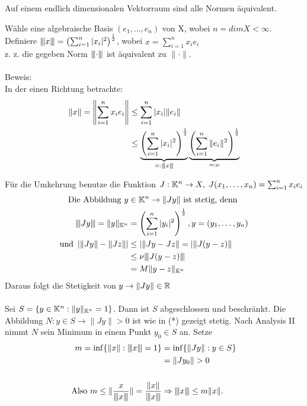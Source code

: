 \begin{satz} 
	Auf einem endlich dimensionalen Vektorraum sind alle Normen äquivalent.
\end{satz}
\begin{beweis}
	Wähle eine algebraische Basis $(e_{1}, \dotsc, e_{n})$ von X, wobei $ n = dim X < \infty$. \\
	Definiere $ {\left\vert\kern-0.25ex\left\vert\kern-0.25ex\left\vert x\right\vert\kern-0.25ex\right\vert\kern-0.25ex\right\vert} = \left(\sum_{i = 1}^{n} |x_{i}|^2\right)^{\frac{1}{2}}$, wobei $x = \sum_{i = 1}^{n} x_{i} e_{i}$ \\
	
	z. z. die gegeben Norm ${\left\vert\kern-0.25ex\left\vert\kern-0.25ex\left\vert \cdot \right\vert\kern-0.25ex\right\vert\kern-0.25ex\right\vert}$ ist äquivalent zu $\| \cdot \|$. \\ \\
	Beweis: \\
	In der einen Richtung betrachte: 
	\begin{align*}
		\| x \| = \left\| \sum_{i = 1}^{n} x_{i} e_{i} \right\| & \leq \sum_{i = 1}^{n} |x_{i}| \|  e_{i} \| \\ 
													& \leq \underbrace{ \left( \sum_{i = 1}^{n} |x_{i}|^{2} \right)^\frac{1}{2} }_{=: {\left\vert\kern-0.25ex\left\vert\kern-0.25ex\left\vert x \right\vert\kern-0.25ex\right\vert\kern-0.25ex\right\vert}} \underbrace{ \left( \sum_{i = 1}^{n} \| e_{i} \|^{2} \right)^\frac{1}{2} }_{=: \nu}
	\end{align*}
	
	Für die Umkehrung benutze die Funktion $J: \mathbb{K}^{n} \rightarrow X, \hspace{0.1cm} J(x_{1}, \dotsc, x_{n}) = \sum_{i = 1}^{n} x_{i} e_{i} $ \\
	\begin{align*}
 	 \text{Die Abbildung } y & \in \mathbb{K}^{n}  \rightarrow \| Jy \| \text{ ist stetig, denn} \\
 	 	 {\left\vert\kern-0.25ex\left\vert\kern-0.25ex\left\vert Jy \right\vert\kern-0.25ex\right\vert\kern-0.25ex\right\vert} = \| y \|_{\mathbb{K}^{n}} & = \left( \sum_{i = 1}^{n} |y_{i}|^{2} \right)^{\frac{1}{2}}, y = (y_{1}, \dotsc, y_{n}) \\
 	 	 \text{und } \left| \| Jy \| - \| Jz \| \right| & \leq | \| Jy - Jz \| = | \| J(y - z) \| \\
 	 	 & \leq \nu {\left\vert\kern-0.25ex\left\vert\kern-0.25ex\left\vert J (y - z) \right\vert\kern-0.25ex\right\vert\kern-0.25ex\right\vert} \\
 	 	 & = M \| y - z \|_{\mathbb{K}^{n}} \\
 	 \end{align*}
 Daraus folgt die Stetigkeit von $ y \rightarrow \| Jy \| \in \mathbb{R} $ \\ \\
	Sei $S = \{y \in \mathbb{K}^{n}: \| y \|_{\mathbb{K}^n} = 1 \}$. Dann ist $S$ abgeschlossen und beschränkt.
	Die Abbildung $N : y \in S \rightarrow \| Jy \| > 0$ ist wie in (*) gezeigt stetig. Nach Analysis II nimmt $N$ sein Minimum in einem Punkt $y_{0} \in S$ an. Setze
		\begin{align*}
			m = \inf\{\| x \| : {\left\vert\kern-0.25ex\left\vert\kern-0.25ex\left\vert x \right\vert\kern-0.25ex\right\vert\kern-0.25ex\right\vert} = 1\} & = \inf \{ \| Jy \|: y \in S \} \\
												& = \| J y_{0} \| > 0 \\ \\
			\text{Also } m \leq \| \frac{x}{ {\left\vert\kern-0.25ex\left\vert\kern-0.25ex\left\vert x \right\vert\kern-0.25ex\right\vert\kern-0.25ex\right\vert} } \| =  \frac{ \| x \| }{ {\left\vert\kern-0.25ex\left\vert\kern-0.25ex\left\vert x \right\vert\kern-0.25ex\right\vert\kern-0.25ex\right\vert} }  &\Rightarrow {\left\vert\kern-0.25ex\left\vert\kern-0.25ex\left\vert x \right\vert\kern-0.25ex\right\vert\kern-0.25ex\right\vert} \leq m \| x \|.
		\end{align*}
\end{beweis}

